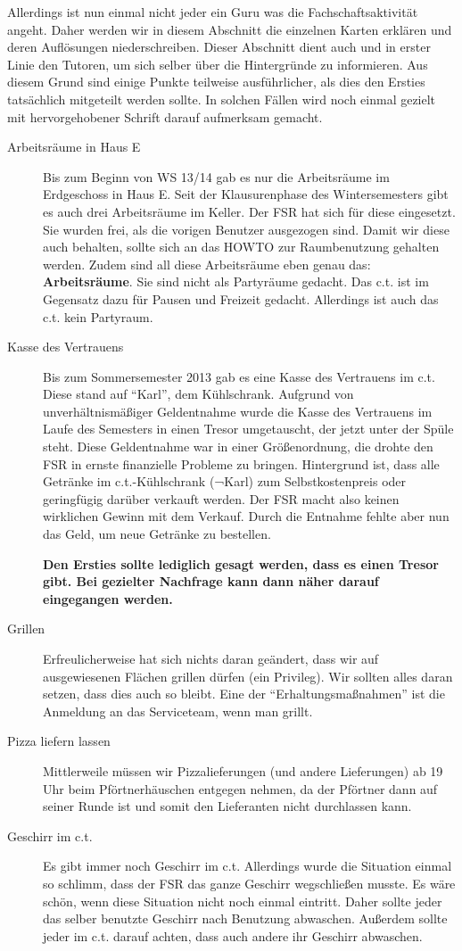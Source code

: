 \documentclass[a4paper,11pt]{scrartcl} %
\begin{document}
	Allerdings ist nun einmal nicht jeder ein Guru was die Fachschaftsaktivität angeht. Daher werden wir in diesem Abschnitt die einzelnen Karten erklären und deren Auflösungen niederschreiben. Dieser Abschnitt dient auch und in erster Linie den Tutoren, um sich selber über die Hintergründe zu informieren. Aus diesem Grund sind einige Punkte teilweise ausführlicher, als dies den Ersties tatsächlich mitgeteilt werden sollte. In solchen Fällen wird noch einmal gezielt mit hervorgehobener Schrift darauf aufmerksam gemacht.
	\begin{description}
		\item[Arbeitsräume in Haus E] Bis zum Beginn von WS 13/14 gab es nur die Arbeitsräume im Erdgeschoss in Haus E. Seit der Klausurenphase des Wintersemesters gibt es auch drei Arbeitsräume im Keller. Der FSR hat sich für diese eingesetzt. Sie wurden frei, als die vorigen Benutzer ausgezogen sind. Damit wir diese auch behalten, sollte sich an das HOWTO zur Raumbenutzung gehalten werden. Zudem sind all diese Arbeitsräume eben genau das: \textbf{Arbeitsräume}. Sie sind nicht als Partyräume gedacht. Das c.t. ist im Gegensatz dazu für Pausen und Freizeit gedacht. Allerdings ist auch das c.t. kein Partyraum.
		\item[Kasse des Vertrauens] Bis zum Sommersemester 2013 gab es eine Kasse des Vertrauens im c.t. Diese stand auf "`Karl"', dem Kühlschrank. Aufgrund von unverhältnismäßiger Geldentnahme wurde die Kasse des Vertrauens im Laufe des Semesters in einen Tresor umgetauscht, der jetzt unter der Spüle steht. Diese Geldentnahme war in einer Größenordnung, die drohte den FSR in ernste finanzielle Probleme zu bringen. Hintergrund ist, dass alle Getränke im c.t.-Kühlschrank (¬Karl) zum Selbstkostenpreis oder geringfügig darüber verkauft werden. Der FSR macht also keinen wirklichen Gewinn mit dem Verkauf. Durch die Entnahme fehlte aber nun das Geld, um neue Getränke zu bestellen.

\textbf{Den Ersties sollte lediglich gesagt werden, dass es einen Tresor gibt. Bei gezielter Nachfrage kann dann näher darauf eingegangen werden.}
		\item[Grillen] Erfreulicherweise hat sich nichts daran geändert, dass wir auf ausgewiesenen Flächen grillen dürfen (ein Privileg). Wir sollten alles daran setzen, dass dies auch so bleibt. Eine der "`Erhaltungsmaßnahmen"' ist die Anmeldung an das Serviceteam, wenn man grillt.
		\item[Pizza liefern lassen] Mittlerweile müssen wir Pizzalieferungen (und andere Lieferungen) ab 19 Uhr beim Pförtnerhäuschen entgegen nehmen, da der Pförtner dann auf seiner Runde ist und somit den Lieferanten nicht durchlassen kann.
		\item[Geschirr im c.t.] Es gibt immer noch Geschirr im c.t. Allerdings wurde die Situation einmal so schlimm, dass der FSR das ganze Geschirr wegschließen musste. Es wäre schön, wenn diese Situation nicht noch einmal eintritt. Daher sollte jeder das selber benutzte Geschirr nach Benutzung abwaschen. Außerdem sollte jeder im c.t. darauf achten, dass auch andere ihr Geschirr abwaschen.
		

\end{description}
\end{document}
